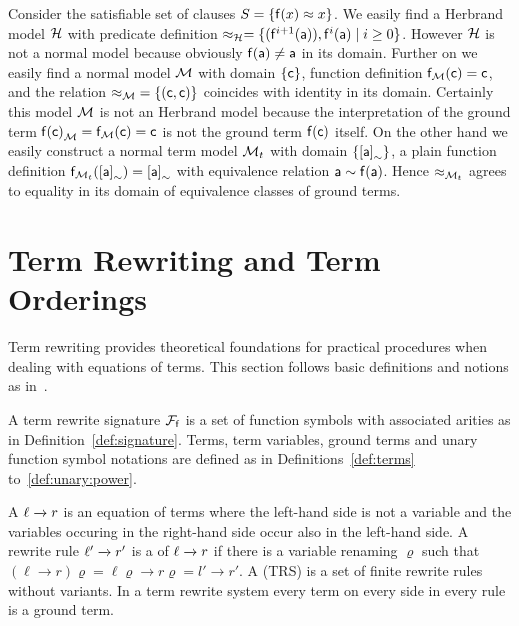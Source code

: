 \begin{example}\label{ex:equality:interpretation}
	Consider the satisfiable set of clauses \( S = \{ \mathsf{f}(x) \approx x \} \).
	We easily find a Herbrand model \( \mathcal{H} \) with
	predicate definition
	\( \approx_{\mathcal{H}} = \{ (\mathsf{f}^{i+1}(\mathsf{a})), \mathsf{f}^{i}(\mathsf{a}) \mid i\geq 0  \}  \).
	However \( \mathcal{H} \) is not a normal model because obviously \( \mathsf{f}(\mathsf{a})\neq\mathsf{a} \) in its domain.
	Further on we easily find a normal model \( \mathcal{M} \)
	with domain \( \{ \mathsf{c} \} \), function definition \( \mathsf{f}_{\mathcal{M}}(\mathsf{c}) = \mathsf{c} \),
	and the relation \( {\approx_{\mathcal{M}}} = \{ (\mathsf{c},\mathsf{c})\} \) coincides with identity in its domain.
	Certainly this model \( \mathcal{M} \) is not an Herbrand model
	because the interpretation of the ground term \( {\mathsf{f}(\mathsf{c})}_{\mathcal{M}} = \mathsf{f}_{\mathcal{M}}(\mathsf{c})=\mathsf{c} \) is not the ground term \( \mathsf{f}(\mathsf{c}) \) itself.
	On the other hand we easily construct a normal term model
	\( \mathcal{M}_t \) with domain \( \{ {[\mathsf{a}]}_\sim \} \),
	a plain function definition
	\( \mathsf{f}_{\mathcal{M}_t}({[\mathsf{a}]}_\sim) = {[\mathsf{a}]}_\sim \)
	with equivalence relation
	\( \mathsf{a} \sim \mathsf{f}(\mathsf{a}) \).
	Hence \( \approx_{\mathcal{M}_t} \) agrees to equality in its domain of equivalence classes of ground terms.
\end{example}


\section{Term Rewriting and Term Orderings}\label{sec:term:rewriting}

Term rewriting provides theoretical foundations for practical procedures
when dealing with equations of terms.
This section follows basic definitions and notions as in~\cite{AM2015L}.

\begin{definition}\label{def:rewrite:signature}
	A term rewrite signature \( {\mathcal{F}_{\mathsf{f}}} \) is a set of function symbols
	with associated arities
	as in Definition~\ref{def:signature}.
	Terms, term variables, ground terms and unary function symbol notations
	are defined as in Definitions~\ref{def:terms} to~\ref{def:unary:power}.
\end{definition}


\begin{definition}\label{def:rewriterule}
	A  \( \ell\xrightarrow[{}]{} r \) is an equation of terms where the left-hand side is not a variable
	and the variables occuring in the right-hand side occur also in the left-hand side.
	A rewrite rule \( \ell'\xrightarrow[{}]{} r' \) is a  of \( \ell\xrightarrow[{}]{} r \) if there is a variable renaming \( \varrho \)
	such that
	\( (\ell\rightarrow r)\varrho = \ell\varrho\rightarrow r\varrho = l'\rightarrow r' \).
	A  (TRS) is a set of finite rewrite rules without variants.
	In a  term rewrite system every term on every side in every rule is a ground term.
\end{definition}

